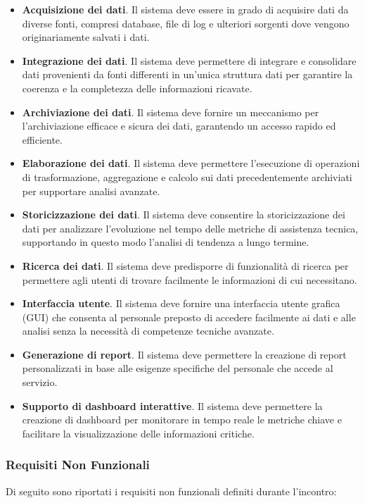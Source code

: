 \begin{itemize}
    \item \textbf{Acquisizione dei dati}. Il sistema deve essere in grado di acquisire dati da diverse fonti, compresi database, file di log e ulteriori sorgenti dove vengono originariamente salvati i dati.
    \item \textbf{Integrazione dei dati}. Il sistema deve permettere di integrare e consolidare dati provenienti da fonti differenti in un'unica struttura dati per garantire la coerenza e la completezza delle informazioni ricavate.
    \item \textbf{Archiviazione dei dati}. Il sistema deve fornire un meccanismo per l'archiviazione efficace e sicura dei dati, garantendo un accesso rapido ed efficiente.
    \item \textbf{Elaborazione dei dati}. Il sistema deve permettere l'esecuzione di operazioni di trasformazione, aggregazione e calcolo sui dati precedentemente archiviati per supportare analisi avanzate.
    \item \textbf{Storicizzazione dei dati}. Il sistema deve consentire la storicizzazione dei dati per analizzare l'evoluzione nel tempo delle metriche di assistenza tecnica, supportando in questo modo l'analisi di tendenza a lungo termine.
    \item \textbf{Ricerca dei dati}. Il sistema deve predisporre di funzionalità di ricerca per permettere agli utenti di trovare facilmente le informazioni di cui necessitano.
    \item \textbf{Interfaccia utente}. Il sistema deve fornire una interfaccia utente grafica (GUI) che consenta al personale preposto di accedere facilmente ai dati e alle analisi senza la necessità di competenze tecniche avanzate.
    \item \textbf{Generazione di report}. Il sistema deve permettere la creazione di report personalizzati in base alle esigenze specifiche del personale che accede al servizio.
    \item \textbf{Supporto di dashboard interattive}. Il sistema deve permettere la creazione di dashboard per monitorare in tempo reale le metriche chiave e facilitare la visualizzazione delle informazioni critiche.
\end{itemize}

\subsubsection{Requisiti Non Funzionali}
Di seguito sono riportati i requisiti non funzionali definiti durante l'incontro:

